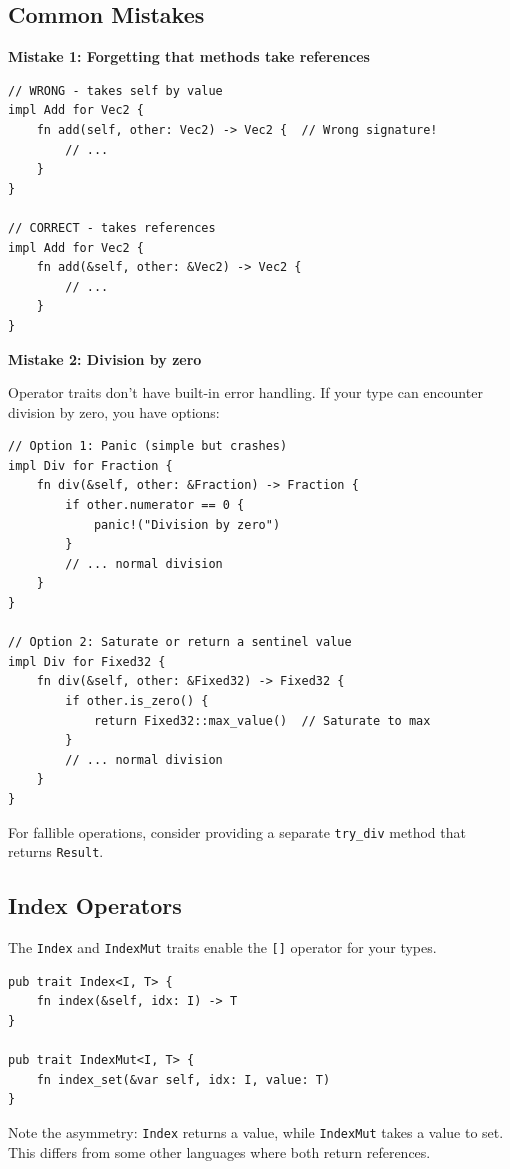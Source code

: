 \subsection{Common Mistakes}

\textbf{Mistake 1: Forgetting that methods take references}

\begin{lstlisting}
// WRONG - takes self by value
impl Add for Vec2 {
    fn add(self, other: Vec2) -> Vec2 {  // Wrong signature!
        // ...
    }
}

// CORRECT - takes references
impl Add for Vec2 {
    fn add(&self, other: &Vec2) -> Vec2 {
        // ...
    }
}
\end{lstlisting}

\textbf{Mistake 2: Division by zero}

Operator traits don't have built-in error handling. If your type can encounter division by zero, you have options:

\begin{lstlisting}
// Option 1: Panic (simple but crashes)
impl Div for Fraction {
    fn div(&self, other: &Fraction) -> Fraction {
        if other.numerator == 0 {
            panic!("Division by zero")
        }
        // ... normal division
    }
}

// Option 2: Saturate or return a sentinel value
impl Div for Fixed32 {
    fn div(&self, other: &Fixed32) -> Fixed32 {
        if other.is_zero() {
            return Fixed32::max_value()  // Saturate to max
        }
        // ... normal division
    }
}
\end{lstlisting}

For fallible operations, consider providing a separate \texttt{try\_div} method that returns \texttt{Result}.

\subsection{Index Operators}
\label{sec:index-operators}

The \texttt{Index} and \texttt{IndexMut} traits enable the \texttt{[]} operator for your types.

\begin{lstlisting}
pub trait Index<I, T> {
    fn index(&self, idx: I) -> T
}

pub trait IndexMut<I, T> {
    fn index_set(&var self, idx: I, value: T)
}
\end{lstlisting}

Note the asymmetry: \texttt{Index} returns a value, while \texttt{IndexMut} takes a value to set. This differs from some other languages where both return references.

